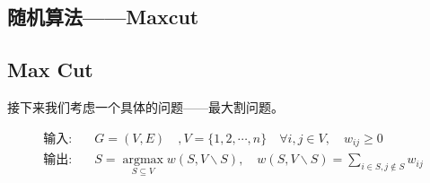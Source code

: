 \documentclass[lang=cn,newtx,10pt,scheme=chinese,chinesefont=nofont,citestyle=gb7714-2015, bibstyle=gb7714-2015]{elegantbook}
\begin{document}
\begin{refsection}




\section{随机算法——Maxcut}

\subsection{Max Cut}

接下来我们考虑一个具体的问题——最大割问题。

\begin{definition}[最大割问题]
    \begin{align*}
        \text{输入}:&\quad G = (V,E)\quad , V=\{1,2,\cdots,n\}\quad \forall i,j \in V,\quad w_{ij} \geq 0\\
        \text{输出}:&\quad S = \mathop{\arg\max}\limits_{S \subseteq V}w(S,V\backslash S),\quad w(S,V\backslash S)= \sum_{i\in S, j\notin S}w_{ij}
    \end{align*}
\end{definition}
\noindent

\begin{tikzpicture}[
    vertex/.style={circle, draw, minimum size=8mm, thick, fill=white},
    edge/.style={thick},
    cut edge/.style={thick, red, dashed},
    normal edge/.style={thick, blue}
]



\end{tikzpicture}
\end{refsection}
\end{document}
